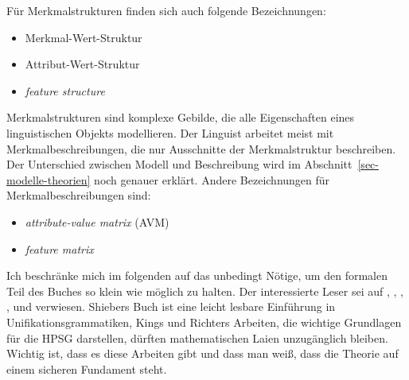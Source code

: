 




Für Merkmalstrukturen finden sich auch folgende Bezeichnungen: 
\begin{itemize}
\item Merkmal-Wert-Struktur
\item Attribut-Wert-Struktur
\item \emph{feature structure}
\end{itemize}
Merkmalstrukturen sind komplexe Gebilde, die alle Eigenschaften eines linguistischen
Objekts modellieren. Der Linguist arbeitet meist mit Merkmalbeschreibungen, die nur Ausschnitte der
Merkmalstruktur beschreiben. Der Unterschied zwischen Modell und Beschreibung wird im Abschnitt~\ref{sec-modelle-theorien}
noch genauer erklärt. Andere Bezeichnungen für Merkmalbeschreibungen sind:
\begin{itemize}
\item \emph{attribute-value matrix} (AVM)
\item \emph{feature matrix}
\end{itemize}
Ich beschränke mich im folgenden auf das unbedingt Nötige, um den formalen Teil
des Buches so klein wie möglich zu halten. Der interessierte Leser sei auf
\citet{Shieber86a}, \citet[Kapitel~2]{ps}, \citet{Johnson88}, \citet{Carpenter92a},
\citet{King94a} und \citet{Richter2004a-u} verwiesen. Shiebers Buch ist
eine leicht lesbare Einführung in Unifikationsgrammatiken, Kings und Richters Arbeiten, die wichtige Grundlagen
für die HPSG darstellen, dürften mathematischen Laien unzugänglich bleiben.
Wichtig ist, dass es diese Arbeiten gibt und dass man weiß, dass die Theorie
auf einem sicheren Fundament steht.

